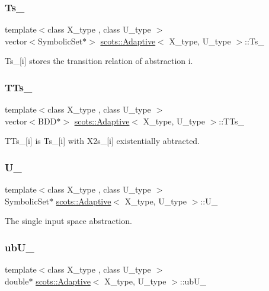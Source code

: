 \subsubsection{\texorpdfstring{Ts\+\_\+}{Ts\_}}
{\footnotesize\ttfamily template$<$class X\+\_\+type , class U\+\_\+type $>$ \\
vector$<$Symbolic\+Set$\ast$$>$ \hyperlink{classscots_1_1Adaptive}{scots\+::\+Adaptive}$<$ X\+\_\+type, U\+\_\+type $>$\+::Ts\+\_\+}

Ts\+\_\+\mbox{[}i\mbox{]} stores the transition relation of abstraction i. \mbox{\label{classscots_1_1Adaptive_a1f4c02094ecd380887640c83fc1d0310}} 
\subsubsection{\texorpdfstring{T\+Ts\+\_\+}{TTs\_}}
{\footnotesize\ttfamily template$<$class X\+\_\+type , class U\+\_\+type $>$ \\
vector$<$B\+DD$\ast$$>$ \hyperlink{classscots_1_1Adaptive}{scots\+::\+Adaptive}$<$ X\+\_\+type, U\+\_\+type $>$\+::T\+Ts\+\_\+}

T\+Ts\+\_\+\mbox{[}i\mbox{]} is Ts\+\_\+\mbox{[}i\mbox{]} with X2s\+\_\+\mbox{[}i\mbox{]} existentially abtracted. \mbox{\label{classscots_1_1Adaptive_a89fa563cfea5b9a7bec6a705ca412a18}} 
\subsubsection{\texorpdfstring{U\+\_\+}{U\_}}
{\footnotesize\ttfamily template$<$class X\+\_\+type , class U\+\_\+type $>$ \\
Symbolic\+Set$\ast$ \hyperlink{classscots_1_1Adaptive}{scots\+::\+Adaptive}$<$ X\+\_\+type, U\+\_\+type $>$\+::U\+\_\+}

The single input space abstraction. \mbox{\label{classscots_1_1Adaptive_aa5c0bc8b175609073aa1f26ad6a83f1c}} 
\subsubsection{\texorpdfstring{ub\+U\+\_\+}{ubU\_}}
{\footnotesize\ttfamily template$<$class X\+\_\+type , class U\+\_\+type $>$ \\
double$\ast$ \hyperlink{classscots_1_1Adaptive}{scots\+::\+Adaptive}$<$ X\+\_\+type, U\+\_\+type $>$\+::ub\+U\+\_\+}

